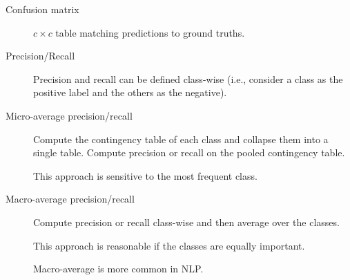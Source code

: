 \begin{description}
    \item[Confusion matrix] 
        $c \times c$ table matching predictions to ground truths.

    \item[Precision/Recall] 
        Precision and recall can be defined class-wise (i.e., consider a class as the positive label and the others as the negative).

    \item[Micro-average precision/recall] 
        Compute the contingency table of each class and collapse them into a single table. Compute precision or recall on the pooled contingency table.

        \begin{remark}
            This approach is sensitive to the most frequent class.
        \end{remark}

    \item[Macro-average precision/recall] 
        Compute precision or recall class-wise and then average over the classes.

        \begin{remark}
            This approach is reasonable if the classes are equally important.
        \end{remark}

        \begin{remark}
            Macro-average is more common in NLP.
        \end{remark}
\end{description}

